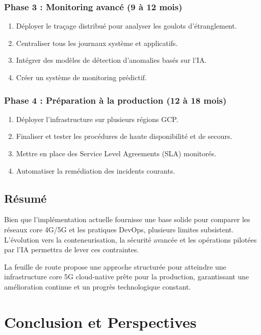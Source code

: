 \documentclass[12pt,a4paper]{report}
\begin{document}
\subsection{Phase 3 : Monitoring avancé (9 à 12 mois)}
\begin{enumerate}
    \item Déployer le traçage distribué pour analyser les goulots d'étranglement.
    \item Centraliser tous les journaux système et applicatifs.
    \item Intégrer des modèles de détection d'anomalies basés sur l'IA.
    \item Créer un système de monitoring prédictif.
\end{enumerate}

\subsection{Phase 4 : Préparation à la production (12 à 18 mois)}
\begin{enumerate}
    \item Déployer l'infrastructure sur plusieurs régions GCP.
    \item Finaliser et tester les procédures de haute disponibilité et de secours.
    \item Mettre en place des Service Level Agreements (SLA) monitorés.
    \item Automatiser la remédiation des incidents courants.
\end{enumerate}

\section{Résumé}

Bien que l'implémentation actuelle fournisse une base solide pour comparer les réseaux core 4G/5G et les pratiques DevOps, plusieurs limites subsistent. L'évolution vers la conteneurisation, la sécurité avancée et les opérations pilotées par l'IA permettra de lever ces contraintes.

La feuille de route propose une approche structurée pour atteindre une infrastructure core 5G cloud-native prête pour la production, garantissant une amélioration continue et un progrès technologique constant.

\newpage

\chapter{Conclusion et Perspectives}
\end{document}
